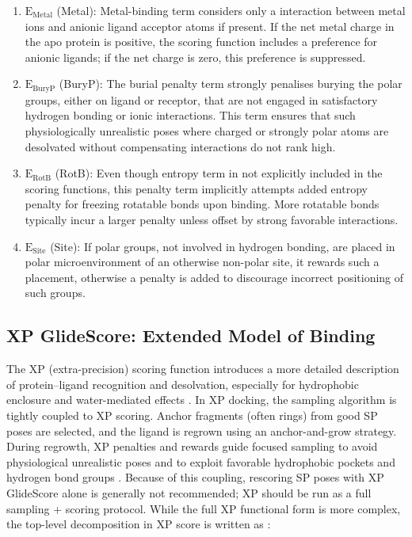 \documentclass[12pt, a4paper]{article}
\begin{document}
\begin{enumerate}
  \item $\text{E}_{\text{Metal}}$ (Metal): Metal-binding term considers only a interaction between metal ions and anionic ligand acceptor atoms if present. If the net metal charge in the apo protein is positive, the scoring function includes a preference for anionic ligands; if the net charge is zero, this preference is suppressed.

  \item $\text{E}_{\text{BuryP}}$ (BuryP): The burial penalty term strongly penalises burying the polar groups, either on ligand or receptor, that are not engaged in satisfactory hydrogen bonding or ionic interactions. This term ensures that such physiologically unrealistic poses where charged or strongly polar atoms are desolvated without compensating interactions \cite{CH7_Friesner2004b,CH7_Friesner2006} do not rank high. 

  \item $\text{E}_{\text{RotB}}$ (RotB): Even though entropy term in not explicitly included in the scoring functions, this penalty term implicitly attempts added entropy penalty for freezing rotatable bonds upon binding.  More rotatable bonds typically incur a larger penalty unless offset by strong favorable interactions. 

  \item $\text{E}_{\text{Site}}$ (Site): If polar groups, not involved in hydrogen bonding, are placed in polar microenvironment of an otherwise non-polar site, it rewards such a placement, otherwise a penalty is added to discourage incorrect positioning of such groups. 

\end{enumerate}


\subsection{XP GlideScore: Extended Model of Binding}

The XP (extra-precision) scoring function introduces a more detailed description of protein–ligand recognition and desolvation, especially for hydrophobic enclosure and water-mediated effects \cite{CH7_Friesner2006}. In XP docking, the sampling algorithm is tightly coupled to XP scoring. Anchor fragments (often rings) from good SP poses are selected, and the ligand is regrown using an anchor-and-grow strategy. During regrowth, XP penalties and rewards guide focused sampling to avoid physiological unrealistic poses and to exploit favorable hydrophobic pockets and hydrogen bond groups \cite{CH7_Friesner2006}. Because of this coupling, rescoring SP poses with XP GlideScore alone is generally not recommended; XP should be run as a full sampling + scoring protocol. While the full XP functional form is more complex, the top-level decomposition in XP score is written as \cite{CH7_Friesner2006}:
\end{document}
